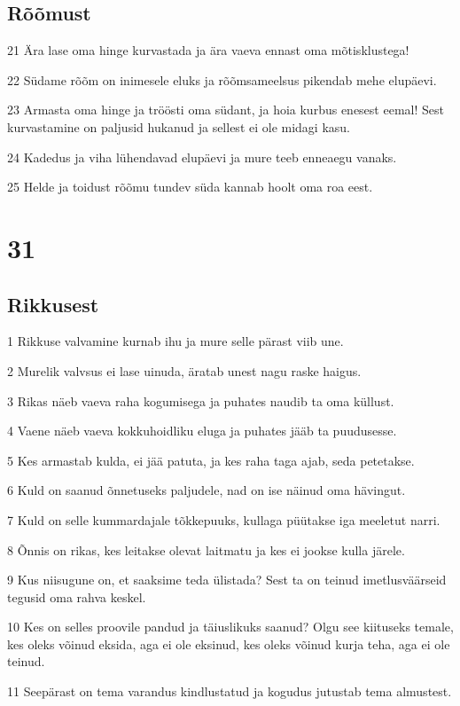 \section*{Rõõmust}

\par 21 Ära lase oma hinge kurvastada ja ära vaeva ennast oma mõtisklustega!
\par 22 Südame rõõm on inimesele eluks ja rõõmsameelsus pikendab mehe elupäevi.
\par 23 Armasta oma hinge ja tröösti oma südant, ja hoia kurbus enesest eemal! Sest kurvastamine on paljusid hukanud ja sellest ei ole midagi kasu.
\par 24 Kadedus ja viha lühendavad elupäevi ja mure teeb enneaegu vanaks.
\par 25 Helde ja toidust rõõmu tundev süda kannab hoolt oma roa eest.

\chapter{31}

\section*{Rikkusest}

\par 1 Rikkuse valvamine kurnab ihu ja mure selle pärast viib une.
\par 2 Murelik valvsus ei lase uinuda, äratab unest nagu raske haigus.
\par 3 Rikas näeb vaeva raha kogumisega ja puhates naudib ta oma küllust.
\par 4 Vaene näeb vaeva kokkuhoidliku eluga ja puhates jääb ta puudusesse.
\par 5 Kes armastab kulda, ei jää patuta, ja kes raha taga ajab, seda petetakse.
\par 6 Kuld on saanud õnnetuseks paljudele, nad on ise näinud oma hävingut.
\par 7 Kuld on selle kummardajale tõkkepuuks, kullaga püütakse iga meeletut narri.
\par 8 Õnnis on rikas, kes leitakse olevat laitmatu ja kes ei jookse kulla järele.
\par 9 Kus niisugune on, et saaksime teda ülistada? Sest ta on teinud imetlusväärseid tegusid oma rahva keskel.
\par 10 Kes on selles proovile pandud ja täiuslikuks saanud? Olgu see kiituseks temale, kes oleks võinud eksida, aga ei ole eksinud, kes oleks võinud kurja teha, aga ei ole teinud.
\par 11 Seepärast on tema varandus kindlustatud ja kogudus jutustab tema almustest.

